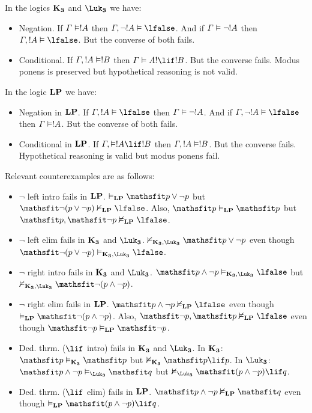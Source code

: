 \documentclass[../../../include/open-logic-section]{subfiles}
\begin{document}
\begin{prop}
In the logics $\Log{K_3}$ and $\Log{\Luk_3}$ we have:
\begin{itemize} 
  \item Negation. If $\Gamma \Entails !A$ then $\Gamma, \lnot !A \Entails \lfalse$. And if $\Gamma \Entails \lnot !A $ then $\Gamma, !A \Entails \lfalse$. But the converse of both fails.
  \item Conditional. If $\Gamma, !A \Entails !B$ then $\Gamma \Entails A! \lif !B$. But the converse fails. Modus ponens is preserved but hypothetical reasoning is not valid.
\end{itemize}
In the logic $\Log{LP}$ we have:
\begin{itemize} 
  \item Negation in $\Log{LP}$. If $\Gamma, !A \Entails \lfalse$ then $\Gamma \Entails \lnot !A$. And if $\Gamma, \lnot !A \Entails \lfalse$ then $\Gamma \Entails !A$. But the converse of both fails.
  \item Conditional in $\Log{LP}$. If  $\Gamma, \Entails !A \lif !B$ then $\Gamma, !A \Entails !B$. But the converse fails. Hypothetical reasoning is valid but modus ponens fail. 
\end{itemize}
\end{prop}

Relevant counterexamples are as follows:

\begin{itemize}
    \item $\lnot$ left intro fails in $\Log{LP}$. $\Entails[\Log{LP}] \Obj{p \lor \lnot p}$ but $\Obj{\lnot (p \lor \lnot p)} \Entails/[\Log{LP}] \lfalse$. Also, $\Obj{p} \Entails[\Log{LP}] \Obj{p}$ but $\Obj{p}, \Obj{\lnot p} \Entails/[\Log{LP}] \lfalse$.
    \item $\lnot$ left elim fails in $\Log{K_3}$ and $\Log{\Luk_3}$. $\Entails/[\Log{K_3,\Luk_3}] \Obj{p \lor \lnot p}$ even though $\Obj{\lnot(p \lor \lnot p)} \Entails[\Log{K_3,\Luk_3}] \lfalse$. 
    \item $\lnot$ right intro fails in $\Log{K_3}$ and $\Log{\Luk_3}$. $\Obj{p \land \lnot p} \Entails[\Log{K_3,\Luk_3}] \lfalse$ but $\Entails/[\Log{K_3,\Luk_3}] \Obj{\lnot (p \land \lnot p)}$.
    \item $\lnot$ right elim fails in $\Log{LP}$. $\Obj{p \land \lnot p} \Entails/[\Log{LP}] \lfalse$ even though $\Entails[\Log{LP}] \Obj{\lnot (p \land \lnot p)}$. Also, $\Obj{\lnot p},\Obj{p} \Entails/[\Log{LP}] \lfalse$ even though $\Obj{\lnot p} \Entails[\Log{LP}] \Obj{\lnot p}$.
    \item Ded. thrm. ($\lif$ intro) fails in $\Log{K_3}$ and $\Log{\Luk_3}$. In $\Log{K_3}$: $\Obj{p} \Entails[\Log{K_3}] \Obj{p}$ but $\Entails/[\Log{K_3}] \Obj{p \lif p}$. In $\Log{\Luk_3}$: $\Obj{p \land \lnot p} \Entails[\Log{\Luk_3}] \Obj{q}$ but $\Entails/[\Log{\Luk_3}] \Obj{(p \land \lnot p) \lif q}$.
    \item Ded. thrm. ($\lif$ elim) fails in $\Log{LP}$. $\Obj{p \land \lnot p} \Entails/[\Log{LP}] \Obj{q}$ even though $\Entails[\Log{LP}] \Obj{(p \land \lnot p) \lif q}$.
\end{itemize}
\end{document}
